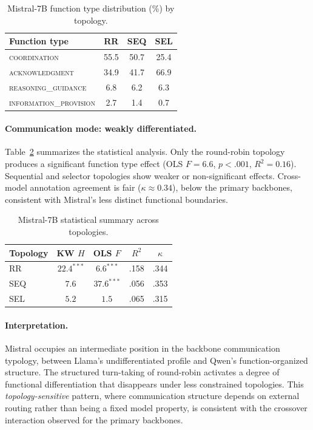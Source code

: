 \begin{table}[htbp]
\centering
\caption{Mistral-7B function type distribution (\%) by topology.}
\label{tab:mistral_dist}
\small
\begin{tabular}{lccc}
\toprule
\textbf{Function type} & \textbf{RR} & \textbf{SEQ} & \textbf{SEL} \\
\midrule
\textsc{coordination}          & 55.5 & 50.7 & 25.4 \\
\textsc{acknowledgment}        & 34.9 & 41.7 & 66.9 \\
\textsc{reasoning\_guidance}   & 6.8  & 6.2  & 6.3  \\
\textsc{information\_provision} & 2.7  & 1.4  & 0.7  \\
\bottomrule
\end{tabular}
\end{table}

\paragraph{Communication mode: weakly differentiated.} Table~\ref{tab:mistral_stats} summarizes the statistical analysis. Only the round-robin topology produces a significant function type effect (OLS $F = 6.6$, $p < .001$, $R^2 = 0.16$). Sequential and selector topologies show weaker or non-significant effects. Cross-model annotation agreement is fair ($\kappa \approx 0.34$), below the primary backbones, consistent with Mistral's less distinct functional boundaries.

\begin{table}[htbp]
\centering
\caption{Mistral-7B statistical summary across topologies.}
\label{tab:mistral_stats}
\small
\begin{tabular}{lcccc}
\toprule
\textbf{Topology} & \textbf{KW $H$} & \textbf{OLS $F$} & \textbf{$R^2$} & $\kappa$ \\
\midrule
RR  & $22.4^{***}$ & $6.6^{***}$ & .158 & .344 \\
SEQ & $7.6$        & $37.6^{***}$ & .056 & .353 \\
SEL & $5.2$        & $1.5$        & .065 & .315 \\
\bottomrule
\end{tabular}
\end{table}

\paragraph{Interpretation.} Mistral occupies an intermediate position in the backbone communication typology, between Llama's undifferentiated profile and Qwen's function-organized structure. The structured turn-taking of round-robin activates a degree of functional differentiation that disappears under less constrained topologies. This \emph{topology-sensitive} pattern, where communication structure depends on external routing rather than being a fixed model property, is consistent with the crossover interaction observed for the primary backbones.

